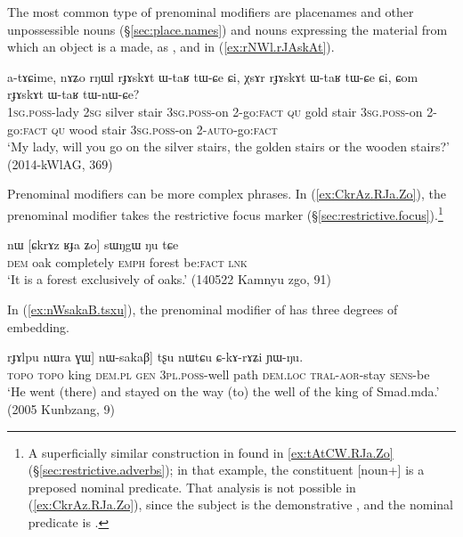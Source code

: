 The most common type of prenominal modifiers are placenames and other unpossessible nouns (§\ref{sec:place.names}) and nouns expressing the material from which an object is a made, as ,  and  in (\ref{ex:rNWl.rJAskAt}).

\begin{exe}
\ex \label{ex:rNWl.rJAskAt}
\gll a-tɤɕime, nɤʑo rŋɯl rɟɤskɤt ɯ-taʁ tɯ-ɕe ɕi, χsɤr rɟɤskɤt ɯ-taʁ tɯ-ɕe ɕi, ɕom rɟɤskɤt ɯ-taʁ tɯ-nɯ-ɕe? \\
\textsc{1sg}.\textsc{poss}-lady \textsc{2sg} silver stair \textsc{3sg}.\textsc{poss}-on 2-go:\textsc{fact}  \textsc{qu} gold stair \textsc{3sg}.\textsc{poss}-on 2-go:\textsc{fact} \textsc{qu} wood stair \textsc{3sg}.\textsc{poss}-on 2-\textsc{auto}-go:\textsc{fact} \\
\glt `My lady, will you go on the silver stairs, the golden stairs or the wooden stairs?' (2014-kWlAG, 369)
\end{exe}

Prenominal modifiers can be more complex phrases. In (\ref{ex:CkrAz.RJa.Zo}), the prenominal modifier  takes the restrictive focus marker   (§\ref{sec:restrictive.focus}).\footnote{A superficially similar construction in found in \ref{ex:tAtCW.RJa.Zo} (§\ref{sec:restrictive.adverbs}); in that example, the constituent [noun+] is a preposed nominal predicate. That analysis is not possible in (\ref{ex:CkrAz.RJa.Zo}), since the subject is the demonstrative , and the nominal predicate is . } 
 
\begin{exe}
\ex \label{ex:CkrAz.RJa.Zo}
 \gll nɯ [ɕkrɤz ʁɟa ʑo] sɯŋgɯ ŋu tɕe \\
 \textsc{dem} oak completely \textsc{emph} forest be:\textsc{fact} \textsc{lnk} \\
 \glt `It is a forest exclusively of oaks.' (140522 Kamnyu zgo, 91)
\end{exe}

In (\ref{ex:nWsakaB.tsxu}), the prenominal modifier of  has three degrees of embedding.

\begin{exe}
\ex \label{ex:nWsakaB.tsxu}
\gll [[[smɤt tɯmda] rɟɤlpu nɯra ɣɯ] nɯ-sakaβ] tʂu nɯtɕu ɕ-kɤ-rɤʑi ɲɯ-ŋu. \\
\textsc{topo}  \textsc{topo} king \textsc{dem}.\textsc{pl} \textsc{gen} \textsc{3pl}.\textsc{poss}-well path \textsc{dem}.\textsc{loc} \textsc{tral}-\textsc{aor}-stay \textsc{sens}-be \\
\glt `He went (there) and stayed on the way (to) the well of the king of Smad.mda.' (2005 Kunbzang, 9)
\end{exe}

